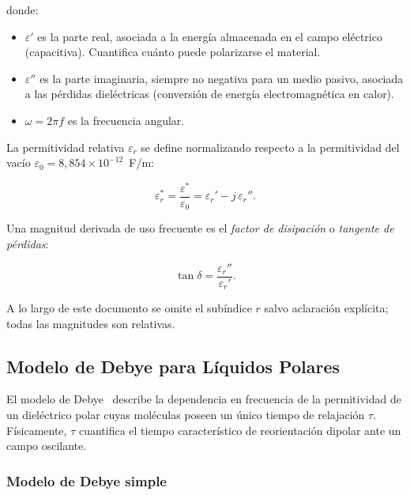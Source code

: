 \noindent donde:
\begin{itemize}
    \item $\varepsilon'$ es la parte real, asociada a la energía almacenada en el campo
          eléctrico (capacitiva). Cuantifica cuánto puede polarizarse el material.
    \item $\varepsilon''$ es la parte imaginaria, siempre no negativa para un medio
          pasivo, asociada a las pérdidas dieléctricas (conversión de energía
          electromagnética en calor).
    \item $\omega = 2\pi f$ es la frecuencia angular.
\end{itemize}

La permitividad relativa $\varepsilon_r$ se define normalizando respecto a la
permitividad del vacío $\varepsilon_0 = 8{,}854 \times 10^{-12}$~F/m:

\begin{equation}
    \varepsilon_r^* = \frac{\varepsilon^*}{\varepsilon_0}
                    = \varepsilon_r' - j\,\varepsilon_r''.
\end{equation}

Una magnitud derivada de uso frecuente es el \emph{factor de disipación} o
\emph{tangente de pérdidas}:

\begin{equation}
    \tan\delta = \frac{\varepsilon_r''}{\varepsilon_r'}.
\end{equation}

A lo largo de este documento se omite el subíndice $r$ salvo aclaración explícita;
todas las magnitudes son relativas.

\newpage
\Encabezado

\subsection{Modelo de Debye para Líquidos Polares}
\label{sec:debye}

El modelo de Debye~\cite{debye1929} describe la dependencia en frecuencia de la
permitividad de un dieléctrico polar cuyas moléculas poseen un único tiempo de
relajación $\tau$. Físicamente, $\tau$ cuantifica el tiempo característico de
reorientación dipolar ante un campo oscilante.

\subsubsection{Modelo de Debye simple}

